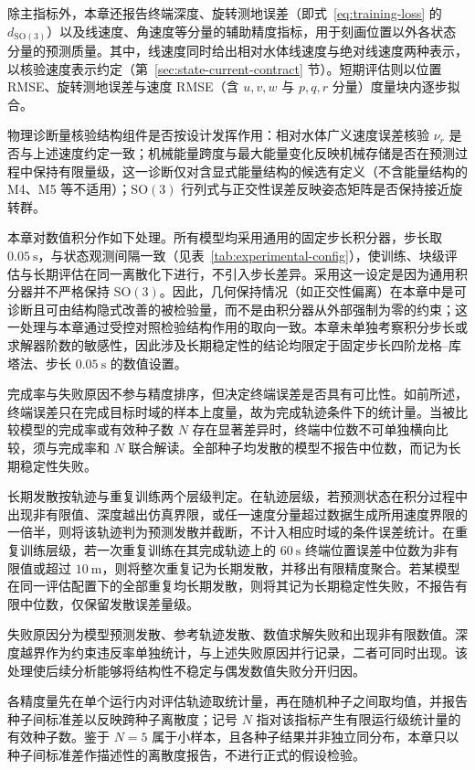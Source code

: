 \documentclass[UTF8,zihao=-4]{ctexrep}
\newcommand{\SO}{\mathrm{SO}}
\begin{document}
除主指标外，本章还报告终端深度、旋转测地误差（即式~\eqref{eq:training-loss} 的 \(d_{\SO(3)}\)）以及线速度、角速度等分量的辅助精度指标，用于刻画位置以外各状态分量的预测质量。其中，线速度同时给出相对水体线速度与绝对线速度两种表示，以核验速度表示约定（第~\ref{sec:state-current-contract} 节）。短期评估则以位置 RMSE、旋转测地误差与速度 RMSE（含 \(u,v,w\) 与 \(p,q,r\) 分量）度量块内逐步拟合。

物理诊断量核验结构组件是否按设计发挥作用：相对水体广义速度误差核验 \(\nu_r\) 是否与上述速度约定一致；机械能量跨度与最大能量变化反映机械存储是否在预测过程中保持有限量级，这一诊断仅对含显式能量结构的候选有定义（不含能量结构的 M4、M5 等不适用）；\(\SO(3)\) 行列式与正交性误差反映姿态矩阵是否保持接近旋转群。

本章对数值积分作如下处理。所有模型均采用通用的固定步长积分器，步长取 \(0.05~\mathrm{s}\)，与状态观测间隔一致（见表~\ref{tab:experimental-config}），使训练、块级评估与长期评估在同一离散化下进行，不引入步长差异。采用这一设定是因为通用积分器并不严格保持 \(\SO(3)\)。因此，几何保持情况（如正交性偏离）在本章中是可诊断且可由结构隐式改善的被检验量，而不是由积分器从外部强制为零的约束；这一处理与本章通过受控对照检验结构作用的取向一致。本章未单独考察积分步长或求解器阶数的敏感性，因此涉及长期稳定性的结论均限定于固定步长四阶龙格--库塔法、步长 \(0.05~\mathrm{s}\) 的数值设置。

完成率与失败原因不参与精度排序，但决定终端误差是否具有可比性。如前所述，终端误差只在完成目标时域的样本上度量，故为完成轨迹条件下的统计量。当被比较模型的完成率或有效种子数 \(N\) 存在显著差异时，终端中位数不可单独横向比较，须与完成率和 \(N\) 联合解读。全部种子均发散的模型不报告中位数，而记为长期稳定性失败。

长期发散按轨迹与重复训练两个层级判定。在轨迹层级，若预测状态在积分过程中出现非有限值、深度越出仿真界限，或任一速度分量超过数据生成所用速度界限的一倍半，则将该轨迹判为预测发散并截断，不计入相应时域的条件误差统计。在重复训练层级，若一次重复训练在其完成轨迹上的 \(60~\mathrm{s}\) 终端位置误差中位数为非有限值或超过 \(10~\mathrm{m}\)，则将整次重复记为长期发散，并移出有限精度聚合。若某模型在同一评估配置下的全部重复均长期发散，则将其记为长期稳定性失败，不报告有限中位数，仅保留发散误差量级。

失败原因分为模型预测发散、参考轨迹发散、数值求解失败和出现非有限数值。深度越界作为约束违反率单独统计，与上述失败原因并行记录，二者可同时出现。该处理使后续分析能够将结构性不稳定与偶发数值失败分开归因。

各精度量先在单个运行内对评估轨迹取统计量，再在随机种子之间取均值，并报告种子间标准差以反映跨种子离散度；记号 \(N\) 指对该指标产生有限运行级统计量的有效种子数。鉴于 \(N=5\) 属于小样本，且各种子结果并非独立同分布，本章只以种子间标准差作描述性的离散度报告，不进行正式的假设检验。
\end{document}
